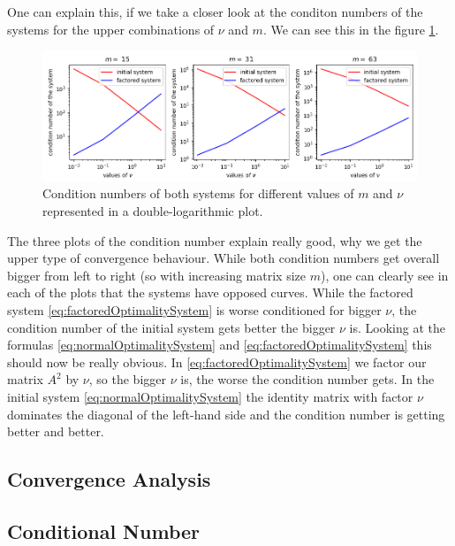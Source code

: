 \documentclass{amsart}
\theoremstyle{definition}
\theoremstyle{remark}
\numberwithin{equation}{section}
\begin{document}
One can explain this, if we take a closer look at the conditon numbers of the systems for the upper combinations of $\nu$ and $m$. We can see this in the 
figure \ref{fig:CG-conditionNumber}.
\begin{figure}[h!]
\centering
\includegraphics[scale=0.65]{./imgs/CG_conditionNumber}
\caption{Condition numbers of both systems for different values of $m$ and $\nu$ represented in a double-logarithmic plot.}
\label{fig:CG-conditionNumber}
\end{figure}
The three plots of the condition number explain really good, why we get the upper type of convergence behaviour. While both condition numbers get overall
bigger from left to right (so with increasing matrix size $m$), one can clearly see in each of the plots that the systems have opposed curves. While the 
factored system \eqref{eq:factoredOptimalitySystem} is worse conditioned for bigger $\nu$, the condition number of the initial system gets better
the bigger $\nu$ is. Looking at the formulas \eqref{eq:normalOptimalitySystem} and \eqref{eq:factoredOptimalitySystem} this should now be really obvious.
In \eqref{eq:factoredOptimalitySystem} we factor our matrix $A^2$ by $\nu$, so the bigger $\nu$ is, the worse the condition number gets. In the initial 
system \eqref{eq:normalOptimalitySystem} the identity matrix with factor $\nu$ dominates the diagonal of the left-hand side and the condition number is 
getting better and better.


\subsection{Convergence Analysis}


\subsection{Conditional Number}
\end{document}
